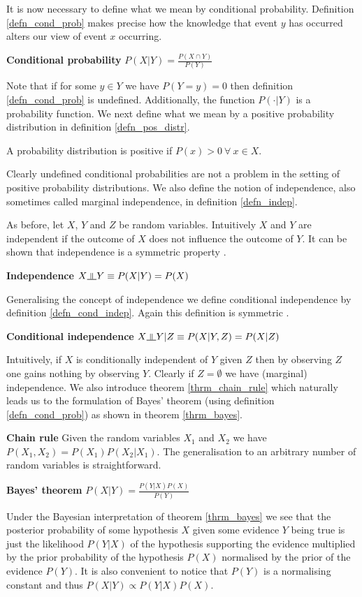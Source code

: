 It is now necessary to define what we mean by conditional probability. Definition \ref{defn_cond_prob} makes precise how the knowledge that event $y$ has occurred alters our view of event $x$ occurring.  
\begin{defn}
\textbf{Conditional probability} $P(X|Y) = \frac{P(X \cap Y)}{P(Y)}$ 
\label{defn_cond_prob}
\end{defn}
Note that if for some $y \in Y$ we have $P(Y=y) = 0$ then definition \ref{defn_cond_prob} is undefined. Additionally, the function $P(\cdot|Y)$ is a probability function. We next define what we mean by a positive probability distribution in definition \ref{defn_pos_distr}.
\begin{defn}
A probability distribution is positive if $P(x) > 0~\forall~x \in X$.
\label{defn_pos_distr}
\end{defn}
Clearly undefined conditional probabilities are not a problem in the setting of positive probability distributions. We also define the notion of independence, also sometimes called marginal independence, in definition \ref{defn_indep}. 

As before, let $X$, $Y$ and $Z$ be random variables. Intuitively $X$ and $Y$ are independent if the outcome of $X$ does not influence the outcome of $Y$. It can be shown that independence is a symmetric property \cite{koller}.
\begin{defn}
\textbf{Independence} $X \indep Y \equiv P(X|Y) = P(X)$ 
\label{defn_indep}
\end{defn}
Generalising the concept of independence we define conditional independence by definition \ref{defn_cond_indep}. Again this definition is symmetric \cite{koller}.
\begin{defn}
\textbf{Conditional independence} $X \indep Y | Z \equiv P(X|Y,Z) = P(X|Z)$
\label{defn_cond_indep}
\end{defn}
Intuitively, if $X$ is conditionally independent of $Y$ given $Z$ then by observing $Z$ one gains nothing by observing $Y$. Clearly if $Z=\emptyset$ we have (marginal) independence. We also introduce theorem \ref{thrm_chain_rule} which naturally leads us to the formulation of Bayes' theorem (using definition \ref{defn_cond_prob}) as shown in theorem \ref{thrm_bayes}. 
\begin{thrm}
\label{thrm_chain_rule}  
\textbf{Chain rule} Given the random variables $X_1$ and $X_2$ we have $P(X_1,X_2) = P(X_1)P(X_2|X_1)$. The generalisation to an arbitrary number of random variables is straightforward.
\end{thrm}
\begin{thrm}
\textbf{Bayes' theorem} $P(X|Y) = \frac{P(Y|X)P(X)}{P(Y)}$
\label{thrm_bayes}
\end{thrm}
Under the Bayesian interpretation of theorem \ref{thrm_bayes} we see that the posterior probability of some hypothesis $X$ given some evidence $Y$ being true is just the likelihood $P(Y|X)$ of the hypothesis supporting the evidence multiplied by the prior probability of the hypothesis $P(X)$ normalised by the prior of the evidence $P(Y)$. It is also convenient to notice that $P(Y)$ is a normalising constant and thus  $P(X|Y) \propto P(Y|X)P(X)$.

